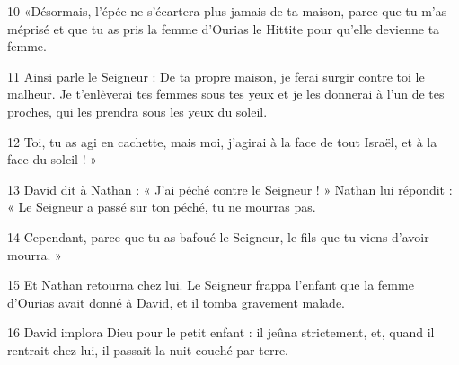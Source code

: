 
10 «Désormais, l’épée ne s’écartera plus jamais de ta maison, parce que tu m’as méprisé et que tu as pris la femme d’Ourias le Hittite pour qu’elle devienne ta femme.

11 Ainsi parle le Seigneur : De ta propre maison, je ferai surgir contre toi le malheur. Je t’enlèverai tes femmes sous tes yeux et je les donnerai à l’un de tes proches, qui les prendra sous les yeux du soleil.

12 Toi, tu as agi en cachette, mais moi, j’agirai à la face de tout Israël, et à la face du soleil ! »

13 David dit à Nathan : « J’ai péché contre le Seigneur ! » Nathan lui répondit : « Le Seigneur a passé sur ton péché, tu ne mourras pas.

14 Cependant, parce que tu as bafoué le Seigneur, le fils que tu viens d’avoir mourra. »

15 Et Nathan retourna chez lui. Le Seigneur frappa l’enfant que la femme d’Ourias avait donné à David, et il tomba gravement malade.

16 David implora Dieu pour le petit enfant : il jeûna strictement, et, quand il rentrait chez lui, il passait la nuit couché par terre.